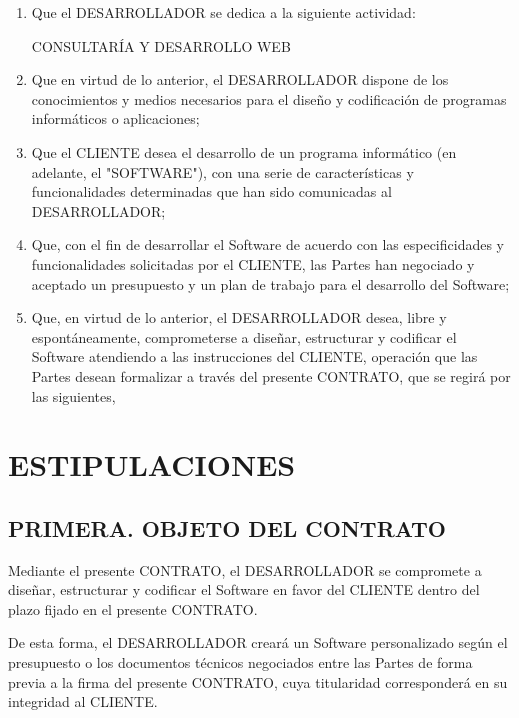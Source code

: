 \documentclass[a4paper,11pt]{report}
\begin{document}
	\begin{enumerate}[label=\roman*.]
		\item Que el DESARROLLADOR se dedica a la siguiente actividad:

			CONSULTARÍA Y DESARROLLO WEB

		\item Que en virtud de lo anterior, el DESARROLLADOR dispone de los
		conocimientos y medios necesarios para el diseño y codificación de
		programas informáticos o aplicaciones;

		\item Que el CLIENTE desea el desarrollo de un programa informático (en
		adelante, el "SOFTWARE"), con una serie de características y
		funcionalidades determinadas que han sido comunicadas al DESARROLLADOR;

		\item Que, con el fin de desarrollar el Software de acuerdo con las
		especificidades y funcionalidades solicitadas por el CLIENTE, las Partes
		han negociado y aceptado un presupuesto y un plan de trabajo para el
		desarrollo del Software;

		\item Que, en virtud de lo anterior, el DESARROLLADOR desea, libre y
		espontáneamente, comprometerse a diseñar, estructurar y codificar el
		Software atendiendo a las instrucciones del CLIENTE, operación que las
		Partes desean formalizar a través del presente CONTRATO, que se regirá
		por las siguientes,
	\end{enumerate}

	\section*{ESTIPULACIONES}

	\subsection*{PRIMERA. OBJETO DEL CONTRATO}

	Mediante el presente CONTRATO, el DESARROLLADOR se compromete a diseñar,
	estructurar y codificar el Software en favor del CLIENTE dentro del
	plazo fijado en el presente CONTRATO.

	De esta forma, el DESARROLLADOR creará un Software personalizado según
	el presupuesto o los documentos técnicos negociados entre las Partes de
	forma previa a la firma del presente CONTRATO, cuya titularidad
	corresponderá en su integridad al CLIENTE.
\end{document}
